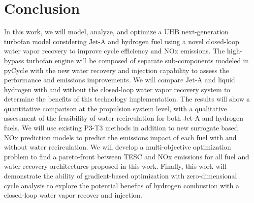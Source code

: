 \documentclass[conf]{new-aiaa}
\begin{document}
\section{Conclusion}
In this work, we will model, analyze, and optimize a UHB next-generation turbofan model considering Jet-A and hydrogen fuel using a novel closed-loop water vapor recovery to improve cycle efficiency and NOx emissions.
The high-bypass turbofan engine will be composed of separate sub-components modeled in pyCycle with the new water recovery and injection capability to assess the performance and emissions improvements.
We will compare Jet-A and liquid hydrogen with and without the closed-loop water vapor recovery system to determine the benefits of this technology implementation.
The results will show a quantitative comparison at the propulsion system level, with a qualitative assessment of the feasibility of water recirculation for both Jet-A and hydrogen fuels.
We will use existing P3-T3 methods in addition to new surrogate based NOx prediction models to predict the emissions impact of each fuel with and without water recirculation.
We will develop a multi-objective optimization problem to find a pareto-front between TESC and NOx emissions for all fuel and water recovery architectures proposed in this work.
Finally, this work will demonstrate the ability of gradient-based optimization with zero-dimensional cycle analysis to explore the potential benefits of hydrogen combustion with a closed-loop water vapor recover and injection.


\end{document}
